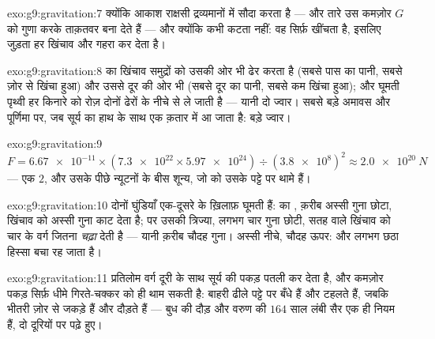 \begin{solution}{exo:g9:gravitation:7}
क्योंकि आकाश राक्षसी द्रव्यमानों में सौदा करता है ---  और तारे उस
कमज़ोर $G$ को गुणा करके ताक़तवर  बना देते हैं --- और क्योंकि
 कभी कटता नहीं: वह सिर्फ़ खींचता है, इसलिए जुड़ता हर
 खिंचाव और गहरा कर देता है।
\end{solution}

\begin{solution}{exo:g9:gravitation:8}
 का खिंचाव समुद्रों को उसकी ओर भी ढेर करता है (सबसे पास का
पानी, सबसे ज़ोर से खिंचा हुआ) और उससे दूर की ओर भी (सबसे दूर का पानी,
सबसे कम खिंचा हुआ); और घूमती पृथ्वी हर किनारे को रोज़ दोनों ढेरों के
नीचे से ले जाती है --- यानी दो ज्वार। सबसे बड़े अमावस और पूर्णिमा पर,
जब सूर्य का हाथ  के साथ एक क़तार में आ जाता है: बड़े ज्वार।
\end{solution}

\begin{solution}{exo:g9:gravitation:9}
$F = \num{6.67e-11} \times (\num{7.3e22} \times \num{5.97e24})
\div (\num{3.8e8})^2 \approx \qty{2.0e20}{N}$ --- एक $2$, और
उसके पीछे न्यूटनों के बीस शून्य, जो  को उसके पट्टे पर थामे हैं।
\end{solution}

\begin{solution}{exo:g9:gravitation:10}
दोनों घुंडियाँ एक-दूसरे के ख़िलाफ़ घूमती हैं:  का ,
क़रीब अस्सी गुना छोटा, खिंचाव को अस्सी गुना काट देता है; पर उसकी
त्रिज्या, लगभग चार गुना छोटी, सतह वाले खिंचाव को चार के वर्ग जितना
\emph{चढ़ा} देती है --- यानी क़रीब चौदह गुना। अस्सी नीचे, चौदह ऊपर: और
लगभग छठा हिस्सा बचा रह जाता है।
\end{solution}

\begin{solution}{exo:g9:gravitation:11}
प्रतिलोम वर्ग दूरी के साथ सूर्य की पकड़ पतली कर देता है, और कमज़ोर
पकड़ सिर्फ़ धीमे गिरते-चक्कर को ही थाम सकती है: बाहरी  ढीले पट्टे
पर बँधे हैं और टहलते हैं, जबकि भीतरी ज़ोर से जकड़े हैं और दौड़ते हैं
--- बुध की दौड़ और वरुण की $164$ साल लंबी सैर एक ही नियम हैं, दो
दूरियों पर पढ़े हुए।
\end{solution}

